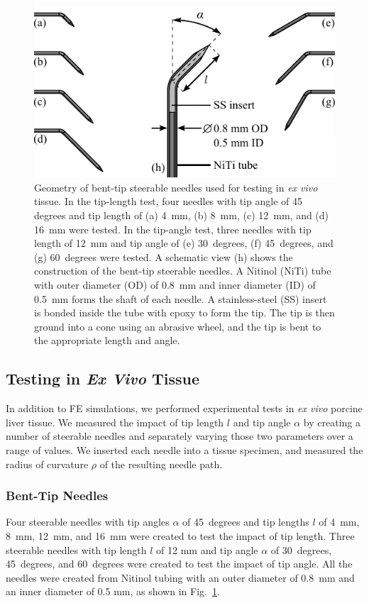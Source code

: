\begin{figure}[!t]
\centering
\includegraphics[width=0.65\columnwidth]{Images/Chapter3/Bent-TipGeometry/Bent-TipGeometry}%
\caption[Geometry of bent-tip steerable needles used for testing]{Geometry of bent-tip steerable needles used for testing in \textit{ex vivo} tissue. In the tip-length test, four needles with tip angle of 45 degrees and tip length of (a) 4~mm, (b) 8~mm, (c) 12~mm, and (d) 16~mm were tested. In the tip-angle test, three needles with tip length of 12~mm and tip angle of (e) 30~degrees, (f) 45~degrees, and (g) 60~degrees were tested. A schematic view (h) shows the construction of the bent-tip steerable needles. A Nitinol (NiTi) tube with outer diameter (OD) of 0.8~mm and inner diameter (ID) of 0.5~mm forms the shaft of each needle. A stainless-steel (SS) insert is bonded inside the tube with epoxy to form the tip. The tip is then ground into a cone using an abrasive wheel, and the tip is bent to the appropriate length and angle.}
\label{fig:Bent-TipGeometry}
\end{figure}

\subsection{Testing in \textit{Ex Vivo} Tissue}
In addition to FE simulations, we performed experimental tests in \textit{ex vivo} porcine liver tissue. We measured the impact of tip length $l$ and tip angle $\alpha$ by creating a number of steerable needles and separately varying those two parameters over a range of values. We inserted each needle into a tissue specimen, and measured the radius of curvature $\rho$ of the resulting needle path.

\subsubsection{Bent-Tip Needles}
Four steerable needles with tip angles $\alpha$ of 45~degrees and tip lengths $l$ of 4~mm, 8~mm, 12~mm, and 16~mm were created to test the impact of tip length. Three steerable needles with tip length $l$ of 12 mm and tip angle $\alpha$ of 30~degrees, 45~degrees, and 60~degrees were created to test the impact of tip angle. All the needles were created from Nitinol tubing with an outer diameter of 0.8~mm and an inner diameter of 0.5 mm, as shown in Fig.~\ref{fig:Bent-TipGeometry}.

